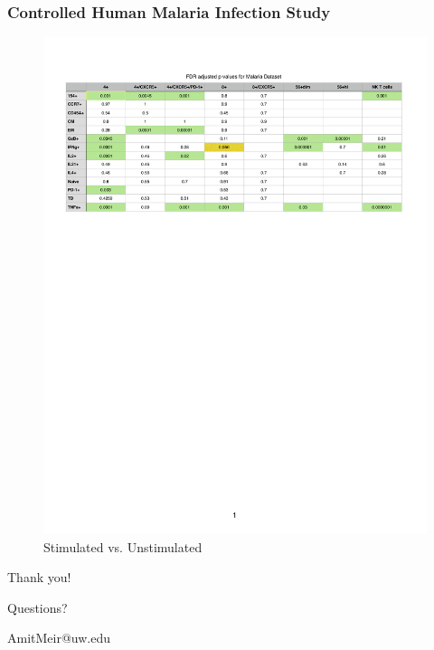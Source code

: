 \documentclass{beamer}
\theoremstyle{definition}
\begin{document}
\begin{frame}
\frametitle{Controlled Human Malaria Infection Study}
\begin{figure}[]
\includegraphics[width=12 cm]{figures/malariaQvals} \caption{Stimulated vs. Unstimulated}
\end{figure}
\end{frame}


\begin{frame}
\begin{center}
\huge{Thank you!}

\vspace{2 cm}
\LARGE{Questions?}

\vspace{1cm}
\large{AmitMeir@uw.edu}
\end{center}
\end{frame}
\end{document}
